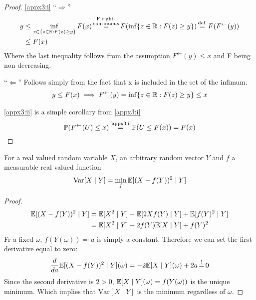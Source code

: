 \begin{proof}
    \ref{appx3:i} ``\(\Rightarrow\)''
    \begin{align*}
        y&\le \inf_{x\in \{z\in\R: F(z)\ge y\}} F(x) 
        \xeq{\substack{
            \text{F right-}\\
            \text{continuous}}
        } F(\inf\{z\in\R: F(z)\ge y\})
        \xeq{\text{def.}} F(F^\leftarrow(y))\\
        &\le F(x)
    \end{align*}
    Where the last inequality follows from the assumption \(F^\leftarrow (y)\le x\) and F being non decreasing.

    \noindent ``\(\Leftarrow\)'' Follows simply from the fact that x is included in the set of the infimum. 
    \begin{align*}
        y\le F(x) \implies F^\leftarrow (y) = \inf\{z\in\mathbb{R}:F(z)\ge y\} \le x
    \end{align*}

    \noindent \ref{appx3:ii} is a simple corollary from \ref{appx3:i}
    \[
        \Pr(F^\leftarrow (U)\le x) 
        \xeq{\text{\ref{appx3:i}}} \Pr(U\le F(x)) = F(x) 
        \qedhere
    \]
\end{proof}

\begin{lemma}\label{appx4} For a real valued random variable \(X\), an arbitrary random vector \(Y\) and \(f\) a measurable real valued function 
    \[
        \textnormal{Var}[X\mid Y]=\min_{f} \mathbb{E}[ (X-f(Y))^2\mid Y]
    \]
\end{lemma}
\begin{proof}
    \begin{align*}
        \mathbb{E}[(X-f(Y))^2\mid Y] &= \mathbb{E}[X^2\mid Y] - \mathbb{E}[2Xf(Y)\mid Y] + \mathbb{E}[f(Y)^2\mid Y]\\
        &=\mathbb{E}[X^2\mid Y] - 2f(Y)\mathbb{E}[X\mid Y] + f(Y)^2
    \end{align*}  
    Fr a fixed \(\omega\), \(f(Y(\omega))\eqqcolon a\) is simply a constant. Therefore we can set the first derivative equal to zero:
    \begin{align*}
        \frac{d}{da} \E[(X-f(Y))^2\mid Y](\omega)= -2\E[X\mid Y](\omega) +2a \xeq{!} 0
    \end{align*}
    Since the second derivative is \(2>0\), \(\mathbb{E}[X\mid Y](\omega) = f(Y(\omega))\) is the unique minimum. Which implies that \(\text{Var}[X\mid Y]\) is the minimum regardless of \(\omega\).
\end{proof}

